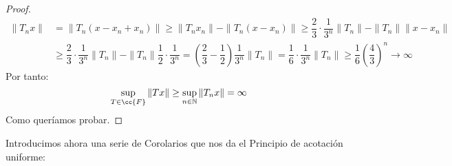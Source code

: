 \begin{teo}
\begin{proof}
\begin{align*}
            \|T_nx\| &= \|T_n(x-x_n + x_n)\| \geq \|T_nx_n\| - \|T_n(x-x_n)\| \geq \dfrac{2}{3}\cdot \dfrac{1}{3^n}\|T_n\| - \|T_n\|\|x-x_n\| \\
                     &\geq \dfrac{2}{3}\cdot \dfrac{1}{3^n}\|T_n\| - \|T_n\|\dfrac{1}{2}\cdot \dfrac{1}{3^n} = \left(\dfrac{2}{3}-\dfrac{1}{2}\right) \dfrac{1}{3^n} \|T_n\| = \dfrac{1}{6}\cdot \dfrac{1}{3^n}\|T_n\| \geq \dfrac{1}{6}{\left(\dfrac{4}{3}\right)}^{n} \to \infty
        \end{align*}
        Por tanto:
        \begin{equation*}
            \sup_{T\in \cc{F}}\|Tx\| \geq \sup_{n\in \mathbb{N}}\|T_nx\| = \infty
        \end{equation*}
        Como queríamos probar.
    \end{proof}
\end{teo}

\noindent
Introducimos ahora una serie de Corolarios que nos da el Principio de acotación uniforme:

